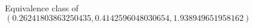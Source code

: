 \documentclass[preview]{standalone}
\begin{document}
\begin{center}
Equivalence class of $(0.26241803863250435, 0.4142596048030654, 1.938949651958162)$
\end{center}
\end{document}
